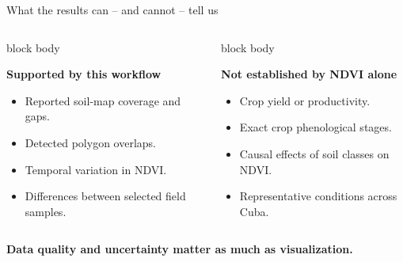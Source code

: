 \documentclass[aspectratio=169,10pt]{beamer}
\begin{document}
	\begin{frame}{What the results can -- and cannot -- tell us}
		
		\begin{columns}[T,onlytextwidth]
			
			
			\begin{beamercolorbox}[
				rounded=true,
				sep=0.25cm,
				wd=\linewidth
				]{block body}
				
				{\large\bfseries\color{forest}
					Supported by this workflow}
				
				\vspace{0.2cm}
				
				\begin{itemize}
					\item Reported soil-map coverage and gaps.
					\item Detected polygon overlaps.
					\item Temporal variation in NDVI.
					\item Differences between selected field samples.
				\end{itemize}
				
			\end{beamercolorbox}
			
			
			\begin{beamercolorbox}[
				rounded=true,
				sep=0.25cm,
				wd=\linewidth
				]{block body}
				
				{\large\bfseries\color{forest}
					Not established by NDVI alone}
				
				\vspace{0.2cm}
				
				\begin{itemize}
					\item Crop yield or productivity.
					\item Exact crop phenological stages.
					\item Causal effects of soil classes on NDVI.
					\item Representative conditions across Cuba.
				\end{itemize}
				
			\end{beamercolorbox}
			
		\end{columns}
		
		\vspace{0.35cm}
		
		\begin{center}
			\textcolor{forest}{
				\bfseries
				Data quality and uncertainty matter as much as visualization.
			}
		\end{center}
		
	\end{frame}
	
\end{document}
